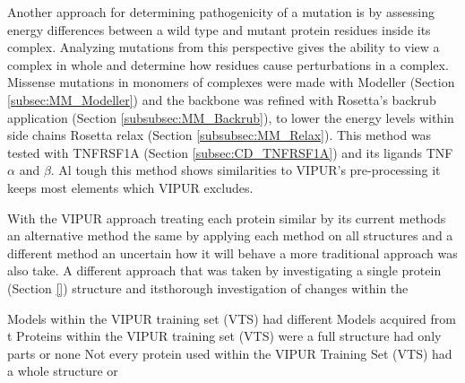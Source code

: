 Another approach for determining pathogenicity of a mutation is by assessing energy differences between a wild type and mutant protein residues inside its complex. Analyzing mutations from this perspective gives the ability to view a complex in whole and determine how residues cause perturbations in a complex. Missense mutations in monomers of complexes were made with Modeller (Section \ref{subsec:MM_Modeller}) and the backbone was refined with Rosetta's backrub application (Section \ref{subsubsec:MM_Backrub}), to lower the energy levels within side chains Rosetta relax (Section \ref{subsubsec:MM_Relax}). This method was tested with TNFRSF1A (Section \ref{subsec:CD_TNFRSF1A}) and its ligands TNF $\alpha$ and $\beta$. Al tough this method shows similarities to VIPUR's pre-processing it keeps most elements which VIPUR excludes. 

With the VIPUR approach treating each protein similar by its current methods an alternative method  the same by applying each method on all structures and   a different method an uncertain how it will behave a more traditional approach was also take.
A different approach that was taken by investigating a single protein (Section \ref{}) structure and itsthorough investigation of changes within the

Models within the VIPUR training set (VTS) had different
Models acquired from t
Proteins within the VIPUR training set (VTS) were a full structure had only parts or none
Not every protein used within the VIPUR Training Set (VTS) had a whole structure or 

